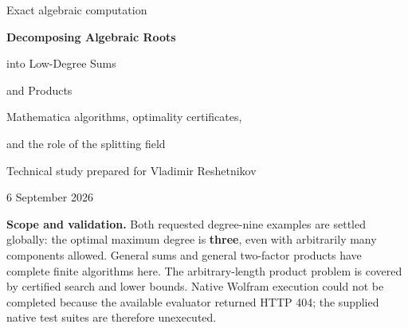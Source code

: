 \documentclass[11pt,a4paper]{article}
\theoremstyle{definition}\newtheorem{definition}[theorem]{Definition}
\theoremstyle{remark}\newtheorem{remark}[theorem]{Remark}
\begin{document}
\begin{titlepage}
\vspace*{10mm}
{\Large\color{olive}Exact algebraic computation}\par\vspace{8mm}
{\huge\bfseries Decomposing Algebraic Roots\par
into Low-Degree Sums\par and Products\par}
\vspace{7mm}
{\Large Mathematica algorithms, optimality certificates,\par
and the role of the splitting field}\par
\vspace{10mm}
{\large Technical study prepared for Vladimir Reshetnikov}\par
6 September 2026
\vspace{11mm}
\begin{abstract}
An algebraic number of degree nine can be a sum or a product of two cubic
numbers, but finding such an identity and proving that it minimizes the
largest component degree are different tasks. We give exact solutions and
optimality proofs for both examples in Mathematica StackExchange question
105933. We then develop a terminating mathematical algorithm for the
unrestricted additive problem, using fixed fields in a Galois closure, and
a terminating algorithm for the unrestricted \emph{two-factor} product
problem, using relative norms and rational linear algebra.

A concrete degree-eight example shows that optimal multiplicative factors
can lie outside even the input's splitting field. It also disproves a
published multiplicative descent assertion whose proof divides by a
possibly zero coefficient. The corrected two-factor criterion explicitly
retains a bounded radical exponent. For arbitrarily many factors we supply
exact, certificate-guided bounded search, not a claimed general terminating
minimizer. The accompanying Wolfram Language package implements these
procedures; independent exact Python checks verify the polynomial identities,
minimal degrees, and finite-group calculations.
\end{abstract}
\vfill
\begin{keybox}
\textbf{Scope and validation.} Both requested degree-nine examples are
settled globally: the optimal maximum degree is \textbf{three}, even with
arbitrarily many components allowed. General sums and general two-factor
products have complete finite algorithms here. The arbitrary-length product
problem is covered by certified search and lower bounds. Native Wolfram
execution could not be completed because the available evaluator returned
HTTP 404; the supplied native test suites are therefore unexecuted.
\end{keybox}
\end{titlepage}
{\small\setlength{\parskip}{0pt}\tableofcontents}
\newpage
\end{document}
